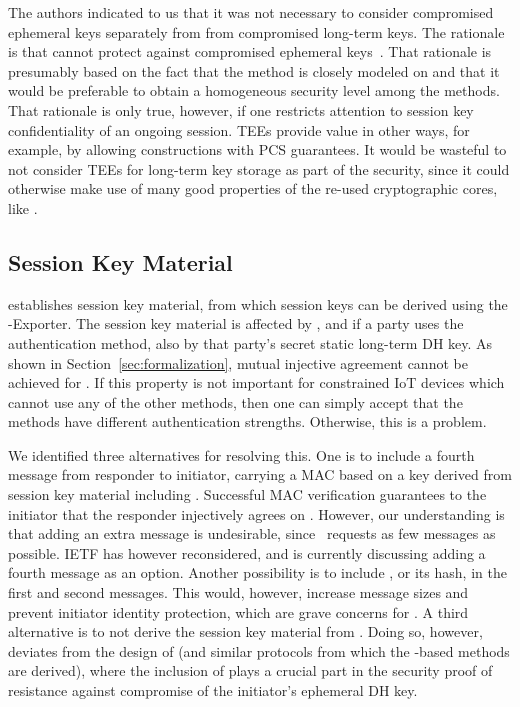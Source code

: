 \documentclass[runningheads, envcountsame, hidelinks, a4paper, draft, x11names]{llncs}
\begin{document}
The \mEdhoc{} authors indicated to us that it was
not necessary to consider compromised ephemeral keys separately from
from compromised long-term keys.
%
The rationale is that \mSigma{} cannot protect against compromised ephemeral
keys~\cite{personalCommunication}.
%
That rationale is presumably based on the fact that the \mSigSig{} method is
closely modeled on \mSigmaI{} and that it would be preferable to obtain a
homogeneous security level among the \mEdhoc{}
methods.
%
That rationale is only true, however, if one restricts attention to session key
confidentiality of an ongoing session.
%
TEEs provide value in other ways, for example, by allowing constructions with
PCS guarantees.
%
It would be wasteful to not consider TEEs for long-term key storage as part of
the security, since it could otherwise make use of many good properties of the
re-used cryptographic cores, like \mOptls.
%
%

\subsection{Session Key Material}
\label{sec:sessionKeyMaterial}
\mEdhoc{} establishes session key material, from which session keys
can be derived using the \mEdhoc{}-Exporter.
%
The session key material is affected by \mGxy{}, and if a party uses the
\mStat{} authentication method, also by that party's secret static long-term DH key.
%
As shown in Section~\ref{sec:formalization}, mutual injective agreement cannot
be achieved for \mGiy{}.
%
If this property is not important for constrained IoT devices which cannot use
any of the other methods, then one can simply accept that the methods have
different authentication strengths.
%
Otherwise, this is a problem.
%

We identified three alternatives for resolving this.
%
One is to include a fourth message from responder to initiator,
carrying a MAC based on a key derived from session key
material including \mGiy{}.
%
Successful MAC verification guarantees
to the initiator that the responder injectively agrees on \mGiy{}.
%
However, our understanding is that adding an extra message is
undesirable, since~\cite{our-analysis-selander-lake-edhoc-00} requests as few messages as
possible.
%
IETF has however reconsidered, and is currently discussing adding a fourth
message as an option.
%
Another possibility is to include \mGi{}, or its hash, in the first and
second messages.
%
This would, however, increase message sizes and prevent initiator identity
protection, which are grave concerns for \mEdhoc{}.
%
A third alternative is to not derive the session key material from \mGiy.
%
Doing so, however, deviates from the design of \mOptls{} (and similar protocols
from which the \mStat{}-based methods are derived), where the inclusion of
\mGiy{} plays a crucial part in the security proof of resistance against
compromise of the initiator's ephemeral DH key.
%
\end{document}
